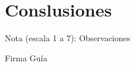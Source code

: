 \documentclass[11pt,letterpaper]{article}
\begin{document}
\section{Conslusiones}




\vspace{3cm}


Nota (escala 1 a 7): 
\vspace{3cm}
Observaciones



\centering Firma Guía



    






\newpage











































\end{document}
